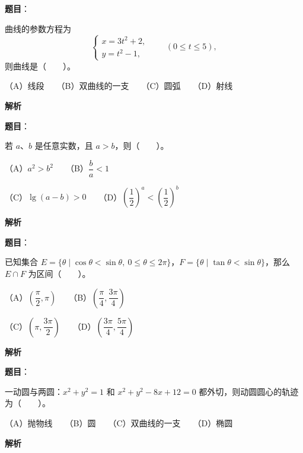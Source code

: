 \begin{answer}

\textbf{题目}：

曲线的参数方程为
\nopagebreak[4]
\[
\begin{cases}
x=3t^2+2,\\
y=t^2-1,
\end{cases}\qquad (0\le t\le5),
\]
则曲线是\mbox{（　　）}。

（A）线段　　（B）双曲线的一支　　（C）圆弧　　（D）射线

\textbf{解析}


\end{answer}
\begin{answer}

\textbf{题目}：

若 $a\text{、}b$ 是任意实数，且 $a>b$，则\mbox{（　　）}。

（A）$a^2>b^2$　　（B）$\dfrac ba<1$

（C）$\lg(a-b)>0$　　（D）$\left(\dfrac12\right)^a<\left(\dfrac12\right)^b$

\textbf{解析}


\end{answer}
\begin{answer}

\textbf{题目}：

已知集合 $E=\{\theta\mid\cos\theta<\sin\theta,\ 0\le\theta\le2\pi\}$，$F=\{\theta\mid\tan\theta<\sin\theta\}$，那么 $E\cap F$ 为区间\mbox{（　　）}。

（A）$\left(\dfrac\pi2,\pi\right)$　　（B）$\left(\dfrac\pi4,\dfrac{3\pi}4\right)$

（C）$\left(\pi,\dfrac{3\pi}2\right)$　　（D）$\left(\dfrac{3\pi}4,\dfrac{5\pi}4\right)$

\textbf{解析}


\end{answer}
\begin{answer}

\textbf{题目}：

一动圆与两圆：$x^2+y^2=1$ 和 $x^2+y^2-8x+12=0$ 都外切，则动圆圆心的轨迹为\mbox{（　　）}。

（A）抛物线　　（B）圆　　（C）双曲线的一支　　（D）椭圆

\textbf{解析}


\end{answer}

